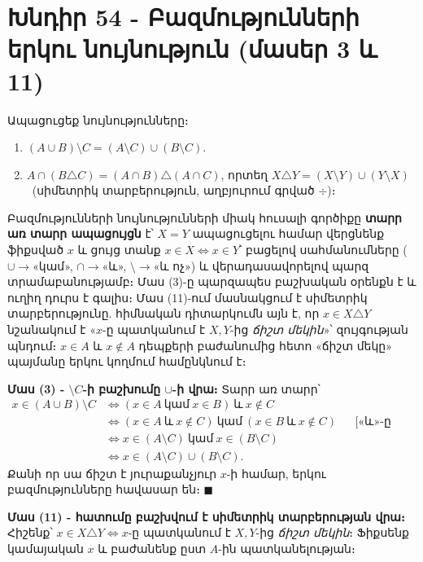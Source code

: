 \documentclass[11pt,a4paper]{article}
\newcommand{\symd}{\triangle}
\begin{document}
\section*{Խնդիր 54 - Բազմությունների երկու նույնություն (մասեր 3 և 11)}

\begin{problembox}[54]
Ապացուցեք նույնությունները։
\begin{enumerate}[label=\textbf{(\arabic*)},leftmargin=1.4cm]
\item[\textbf{(3)}] $(A\cup B)\setminus C=(A\setminus C)\cup(B\setminus C)$.
\item[\textbf{(11)}] $A\cap(B\symd C)=(A\cap B)\symd(A\cap C)$, \quad որտեղ
$X\symd Y=(X\setminus Y)\cup(Y\setminus X)$ \ (սիմետրիկ տարբերություն, աղբյուրում գրված $\div$)։
\end{enumerate}
\end{problembox}

\begin{ideabox}
Բազմությունների նույնությունների միակ հուսալի գործիքը \textbf{տարր առ տարր ապացույցն} է՝ $X=Y$
ապացուցելու համար վերցնենք ֆիքսված $x$ և ցույց տանք $x\in X\Leftrightarrow x\in Y$՝ բացելով սահմանումները
($\cup\to$«կամ», $\cap\to$«և», $\setminus\to$«և ոչ») և վերադասավորելով պարզ տրամաբանությամբ։ Մաս (3)-ը
պարզապես բաշխական օրենքն է և ուղիղ դուրս է գալիս։ Մաս (11)-ում մասնակցում է սիմետրիկ տարբերությունը.
հիմնական դիտարկումն այն է, որ $x\in X\symd Y$ նշանակում է «$x$-ը պատկանում է $X,Y$-ից \emph{ճիշտ
մեկին}»՝ զույգության պնդում։ $x\in A$ և $x\notin A$ դեպքերի բաժանումից հետո «ճիշտ մեկը» պայմանը երկու
կողմում համընկնում է։
\end{ideabox}

\textbf{Մաս (3) - $\setminus C$-ի բաշխումը $\cup$-ի վրա։}
Տարր առ տարր՝
\begin{align*}
x\in(A\cup B)\setminus C
&\iff (x\in A\ \text{կամ}\ x\in B)\ \text{և}\ x\notin C\\
&\iff (x\in A\ \text{և}\ x\notin C)\ \text{կամ}\ (x\in B\ \text{և}\ x\notin C)
   &&\text{[«և»-ը բաշխվում է «կամ»-ի վրա]}\\
&\iff x\in(A\setminus C)\ \text{կամ}\ x\in(B\setminus C)\\
&\iff x\in(A\setminus C)\cup(B\setminus C).
\end{align*}
Քանի որ սա ճիշտ է յուրաքանչյուր $x$-ի համար, երկու բազմությունները հավասար են։ $\blacksquare$

\textbf{Մաս (11) - հատումը բաշխվում է սիմետրիկ տարբերության վրա։}
Հիշենք՝ $x\in X\symd Y\iff x$-ը պատկանում է $X,Y$-ից \emph{ճիշտ մեկին}։ Ֆիքսենք կամայական $x$ և բաժանենք
ըստ $A$-ին պատկանելության։
\end{document}
